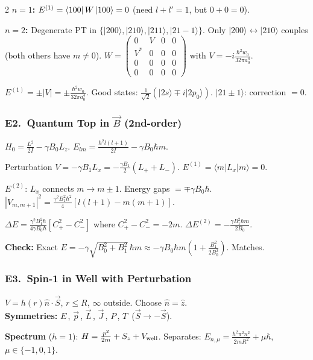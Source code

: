 \documentclass[9pt,a4paper]{article} %
\newcommand{\xmark}{\ding{55}}
\begin{document}
\begin{multicols}{2}
\textbf{$n=1$:} $E^{(1)}=\bra{100}W\ket{100}=0$ (need $l+l'=1$, but $0+0=0$).

\textbf{$n=2$:} Degenerate PT in $\{|200\rangle,|210\rangle,|211\rangle,|21{-}1\rangle\}$.
Only $|200\rangle\leftrightarrow|210\rangle$ couples (both others have $m\ne 0$).
$W=\begin{pmatrix}0&V&0&0\\V^*&0&0&0\\0&0&0&0\\0&0&0&0\end{pmatrix}$
with $V=-i\frac{\hbar^2 w_0}{32\pi a_0^4}$.

$E^{(1)}=\pm|V|=\pm\frac{\hbar^2 w_0}{32\pi a_0^4}$.\;
Good states: $\frac{1}{\sqrt{2}}(|2s\rangle\mp i|2p_0\rangle)$.
$|21\pm 1\rangle$: correction $=0$.

\subsubsection{E2.\ Quantum Top in $\vec{B}$ (2nd-order)}
$H_0=\frac{L^2}{2I}-\gamma B_0 L_z$.\; $E_{lm}=\frac{\hbar^2 l(l+1)}{2I}-\gamma B_0\hbar m$.

Perturbation $V=-\gamma B_1 L_x=-\frac{\gamma B_1}{2}(L_++L_-)$.
$E^{(1)}=\langle m|L_x|m\rangle=0$.

$E^{(2)}$: $L_x$ connects $m\to m\pm 1$. Energy gaps $=\mp\gamma B_0\hbar$.
$|V_{m,m+1}|^2=\frac{\gamma^2 B_1^2\hbar^2}{4}[l(l+1)-m(m+1)]$.

$\Delta E=\frac{\gamma^2 B_1^2\hbar}{4\gamma B_0\hbar}[C_+^2-C_-^2]$ where $C_+^2-C_-^2=-2m$.
$\boxed{\Delta E^{(2)}=-\frac{\gamma B_1^2\hbar m}{2B_0}}$.

\textbf{Check:} Exact $E=-\gamma\sqrt{B_0^2+B_1^2}\,\hbar m\approx -\gamma B_0\hbar m(1+\frac{B_1^2}{2B_0^2})$.\; Matches.

\subsubsection{E3.\ Spin-1 in Well with Perturbation}
$V=h(r)\hat{n}\cdot\vec{S}$, $r\le R$, $\infty$ outside. Choose $\hat{n}=\hat{z}$.
\\
\textbf{Symmetries:}
$E$\,\checkmark,
$\vec{p}$\,\xmark,
$\vec{L}$\,\checkmark,
$\vec{J}$\,\xmark,
$P$\,\checkmark,
$T$\,\xmark\; ($\vec{S}\to -\vec{S}$).


\textbf{Spectrum} ($h=1$): $H=\frac{p^2}{2m}+S_z+V_{\rm well}$. Separates:
$E_{n,\mu}=\frac{\hbar^2\pi^2 n^2}{2mR^2}+\mu\hbar$,\; $\mu\in\{-1,0,1\}$.


\end{multicols}
\end{document}
